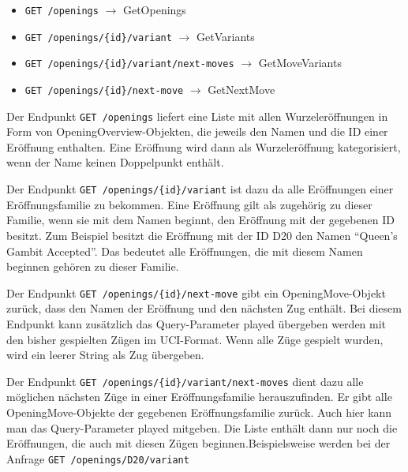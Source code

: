 \begin{itemize}
  \item \lstinline|GET /openings| $\rightarrow$ GetOpenings
  \item \lstinline|GET /openings/{id}/variant| $\rightarrow$ GetVariants
  \item \lstinline|GET /openings/{id}/variant/next-moves| $\rightarrow$ GetMoveVariants
  \item \lstinline|GET /openings/{id}/next-move| $\rightarrow$ GetNextMove
\end{itemize}

Der Endpunkt \lstinline{GET /openings} liefert eine Liste mit allen Wurzeleröffnungen in Form von OpeningOverview-Objekten, die jeweils den Namen und die ID einer Eröffnung enthalten.
Eine Eröffnung wird dann als Wurzeleröffnung kategorisiert, wenn der Name keinen Doppelpunkt enthält. %

Der Endpunkt \lstinline|GET /openings/{id}/variant| ist dazu da alle Eröffnungen einer Eröffnungsfamilie zu bekommen. Eine Eröffnung gilt als zugehörig zu dieser Familie, wenn sie mit dem Namen beginnt, den Eröffnung mit der gegebenen ID besitzt. Zum Beispiel besitzt die Eröffnung mit der ID D20 den Namen \enquote{Queen's Gambit Accepted}. Das bedeutet alle Eröffnungen, die mit diesem Namen beginnen gehören zu dieser Familie.

Der Endpunkt \lstinline|GET /openings/{id}/next-move| gibt ein OpeningMove-Objekt zurück, dass den Namen der Eröffnung und den nächsten Zug enthält. Bei diesem Endpunkt kann zusätzlich das Query-Parameter played übergeben werden mit den bisher gespielten Zügen im \ac{UCI}-Format. Wenn alle Züge gespielt wurden, wird ein leerer String als Zug übergeben.

Der Endpunkt \lstinline|GET /openings/{id}/variant/next-moves| dient dazu alle möglichen nächsten Züge in einer Eröffnungsfamilie herauszufinden. Er gibt alle OpeningMove-Objekte der gegebenen Eröffnungsfamilie zurück. Auch hier kann man das Query-Parameter played mitgeben. Die Liste enthält dann nur noch die Eröffnungen, die auch mit diesen Zügen beginnen.Beispielsweise werden bei der Anfrage \lstinline|GET /openings/D20/variant| 


